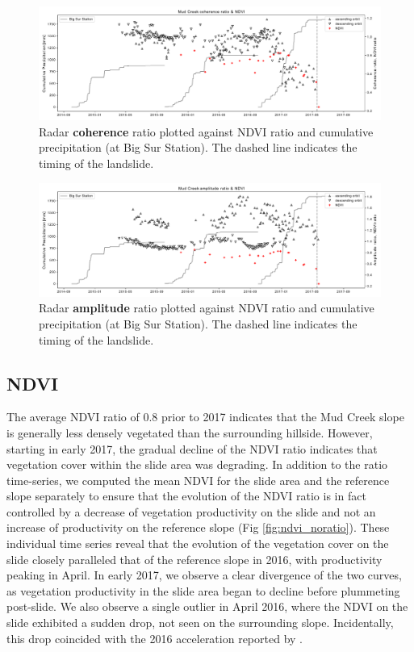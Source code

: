 \documentclass[journal abbreviation, manuscript]{copernicus}
\begin{document}
\begin{figure}[hbt!]
    \centering
    \includegraphics[width = \textwidth]{coherence_ndvi.pdf}
    \caption{Radar \textbf{coherence} ratio plotted against NDVI ratio and cumulative precipitation (at Big Sur Station). The dashed line indicates the timing of the landslide.}
    \label{fig:coherence_timeseries}
\end{figure}

\begin{figure}[hbt!]
    \centering
    \includegraphics[width = \textwidth]{amplitude_ndvi.pdf}
    \caption{Radar \textbf{amplitude} ratio plotted against NDVI ratio and cumulative precipitation (at Big Sur Station). The dashed line indicates the timing of the landslide.}
    \label{fig:amplitude_timeseries}
\end{figure}

\subsection{NDVI}
The average NDVI ratio of 0.8 prior to 2017 indicates that the Mud Creek slope is generally less densely vegetated than the surrounding hillside. However, starting in early 2017, the gradual decline of the NDVI ratio indicates that vegetation cover within the slide area was degrading. In addition to the ratio time-series, we computed the mean NDVI for the slide area and the reference slope separately to ensure that the evolution of the NDVI ratio is in fact controlled by a decrease of vegetation productivity on the slide and not an increase of productivity on the reference slope (Fig \ref{fig:ndvi_noratio}). These individual time series reveal that the evolution of the vegetation cover on the slide closely paralleled that of the reference slope in 2016, with productivity peaking in April. In early 2017, we observe a clear divergence of the two curves, as vegetation productivity in the slide area began to decline before plummeting post-slide. We also observe a single outlier in April 2016, where the NDVI on the slide exhibited a sudden drop, not seen on the surrounding slope. Incidentally, this drop coincided with the 2016 acceleration reported by \citep{Handwerger2019}.   \par
 
\end{document}
